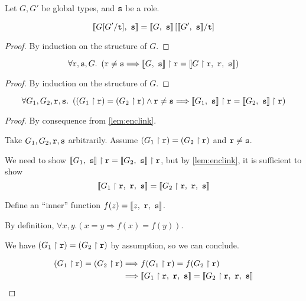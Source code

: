 \begin{lemma}
Let $G, G'$ be global types, and $\mrole{s}$ be a role.

\[
\enc{G[G' / \trecvar]}{s} = \enc{G}{s}\left[ \enc{G'}{s} / \trecvar \right]
\]

\label{lem:encsub}
\end{lemma}

\begin{proof}
By induction on the structure of $G$.
\end{proof}

\begin{lemma}

\[
\forall \mrole{r}, \mrole{s}, G. ~ \left(
\mrole{r} \neq \mrole{s} 
	\Longrightarrow
\proj{\enc{G}{s}}{r} = \enclocal{\proj{G}{r}}{r}{s}
\right)
\]

\label{lem:enclink}
\end{lemma}

\begin{proof}
By induction on the structure of $G$.
\end{proof}

\begin{lemma}
\[
\forall G_1, G_2, \mrole{r}, \mrole{s}. ~ \left(
(\proj{G_1}{r}) = (\proj{G_2}{r}) \wedge \mrole{r} \neq \mrole{s}
	\Longrightarrow
\proj{\enc{G_1}{s}}{r} = \proj{\enc{G_2}{s}}{r}
\right)
\]

\label{lem:encprojeq}
\end{lemma}

\begin{proof} By consequence from \cref{lem:enclink}.

Take $G_1, G_2, \mrole{r}, \mrole{s}$ arbitrarily. 
Assume $(\proj{G_1}{r}) = (\proj{G_2}{r})$ and $\mrole{r} \neq \mrole{s}$.

We need to show $\proj{\enc{G_1}{s}}{r} = \proj{\enc{G_2}{s}}{r}$,
but by \cref{lem:enclink}, it is sufficient to show
\[
\enclocal{\proj{G_1}{r}}{r}{s} = \enclocal{\proj{G_2}{r}}{r}{s}
\]

Define an ``inner'' function $f(z) = \enclocal{z}{r}{s}$.

By definition, $\forall x, y. (x = y \Longrightarrow f(x) = f(y))$.

We have $(\proj{G_1}{r}) = (\proj{G_2}{r})$ by assumption,
so we can conclude.

\begin{align*}
(\proj{G_1}{r}) = (\proj{G_2}{r}) 
&\Longrightarrow f(\proj{G_1}{r}) = f(\proj{G_2}{r})  \\
&\Longrightarrow
\enclocal{\proj{G_1}{r}}{r}{s} = \enclocal{\proj{G_2}{r}}{r}{s}
\end{align*}

\end{proof}